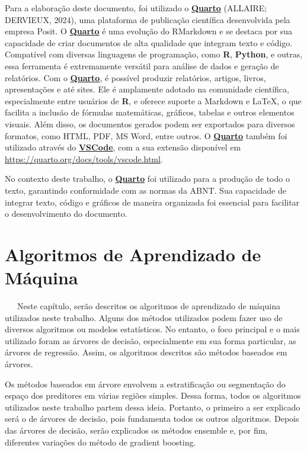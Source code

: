 \documentclass[
  12pt,
  a4paper,
]{scrreprt}
\begin{document}
Para a elaboração deste documento, foi utilizado o
\href{https://quarto.org/}{\textbf{Quarto}} (ALLAIRE; DERVIEUX, 2024),
uma plataforma de publicação científica desenvolvida pela empresa Posit.
O \href{https://quarto.org/}{\textbf{Quarto}} é uma evolução do
RMarkdown e se destaca por sua capacidade de criar documentos de alta
qualidade que integram texto e código. Compatível com diversas
linguagens de programação, como \textbf{R}, \textbf{Python}, e outras,
essa ferramenta é extremamente versátil para análise de dados e geração
de relatórios. Com o \href{https://quarto.org/}{\textbf{Quarto}}, é
possível produzir relatórios, artigos, livros, apresentações e até
sites. Ele é amplamente adotado na comunidade científica, especialmente
entre usuários de \textbf{R}, e oferece suporte a Markdown e \LaTeX, o
que facilita a inclusão de fórmulas matemáticas, gráficos, tabelas e
outros elementos visuais. Além disso, os documentos gerados podem ser
exportados para diversos formatos, como HTML, PDF, MS Word, entre
outros. O \href{https://quarto.org/}{\textbf{Quarto}} também foi
utilizado através do
\href{https://code.visualstudio.com/}{\textbf{VSCode}}, com a sua
extensão disponível em \url{https://quarto.org/docs/tools/vscode.html}.

\vspace{12pt}

No contexto deste trabalho, o
\href{https://quarto.org/}{\textbf{Quarto}} foi utilizado para a
produção de todo o texto, garantindo conformidade com as normas da ABNT.
Sua capacidade de integrar texto, código e gráficos de maneira
organizada foi essencial para facilitar o desenvolvimento do documento.

\chapter{Algoritmos de Aprendizado de
Máquina}\label{algoritmos-de-aprendizado-de-muxe1quina}

~~~Neste capítulo, serão descritos os algoritmos de aprendizado de
máquina utilizados neste trabalho. Alguns dos métodos utilizados podem
fazer uso de diversos algoritmos ou modelos estatísticos. No entanto, o
foco principal e o mais utilizado foram as árvores de decisão,
especialmente em sua forma particular, as árvores de regressão. Assim,
os algoritmos descritos são métodos baseados em árvores.

\vspace{12pt}

Os métodos baseados em árvore envolvem a estratificação ou segmentação
do espaço dos preditores em várias regiões simples. Dessa forma, todos
os algoritmos utilizados neste trabalho partem dessa ideia. Portanto, o
primeiro a ser explicado será o de árvores de decisão, pois fundamenta
todos os outros algoritmos. Depois das árvores de decisão, serão
explicados os métodos ensemble e, por fim, diferentes variações do
método de gradient boosting.
\end{document}
